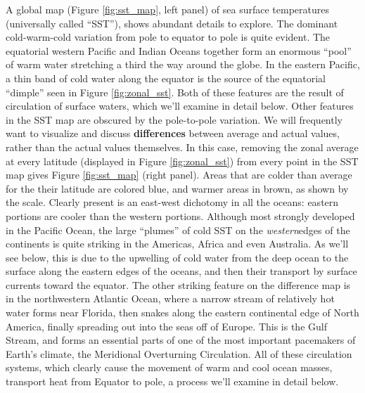 A global map (Figure \ref{fig:sst_map}, left panel) of sea surface temperatures (universally called ``SST''), shows abundant details to explore. The dominant cold-warm-cold variation from pole to equator to pole is quite evident. The equatorial western Pacific and Indian Oceans together form an enormous ``pool'' of warm water stretching a third the way around the globe. In the eastern Pacific, a thin band of cold water along the equator is the source of the equatorial ``dimple'' seen in Figure \ref{fig:zonal_sst}. Both of these features are the result of circulation of surface waters, which we'll examine in detail below. Other features in the SST map are obscured by the pole-to-pole variation. We will frequently want to visualize and discuss \textbf{differences} between average and actual values, rather than the actual values themselves. In this case, removing the zonal average at every latitude (displayed in Figure \ref{fig:zonal_sst}) from every  point in the SST map gives Figure \ref{fig:sst_map} (right panel). Areas that are colder than average for the their latitude are colored blue, and warmer areas in brown, as shown by the scale. Clearly present is an east-west dichotomy in all the oceans: eastern portions are cooler than the western portions. Although most strongly developed in the Pacific Ocean, the large ``plumes'' of cold SST on the \emph{western}edges of the continents is quite striking in the Americas, Africa and even Australia. As we'll see below, this is due to the upwelling of cold water from the deep ocean to the surface along the eastern edges of the oceans, and then their transport by surface currents toward the equator. The other striking feature on the difference map is in the northwestern Atlantic Ocean, where a narrow stream of relatively hot water forms near Florida, then snakes along the eastern continental edge of North America, finally spreading out into the seas off of Europe. This is the Gulf Stream, and forms an essential parts of one of the most important pacemakers of Earth's climate, the Meridional Overturning Circulation. All of these circulation systems, which clearly cause the movement of warm and cool ocean masses, transport heat from Equator to pole, a process we'll examine in detail below. 
